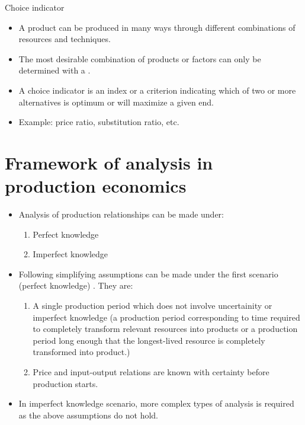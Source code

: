 \documentclass[12pt,ignorenonframetext,aspectratio=169]{beamer}
\providecommand{\tightlist}{%
  \setlength{\itemsep}{0pt}\setlength{\parskip}{0pt}}
\begin{document}
\begin{frame}{}
\protect\hypertarget{section-8}{}
\begin{block}{Choice indicator}
\protect\hypertarget{choice-indicator}{}
\begin{itemize}
\tightlist
\item
  A product can be produced in many ways through different combinations
  of resources and techniques.
\item
  The most desirable combination of products or factors can only be
  determined with a .
\item
  A choice indicator is an index or a criterion indicating which of two
  or more alternatives is optimum or will maximize a given end.
\item
  Example: price ratio, substitution ratio, etc.
\end{itemize}
\end{block}
\end{frame}

\hypertarget{framework-of-analysis-in-production-economics}{%
\section{Framework of analysis in production
economics}\label{framework-of-analysis-in-production-economics}}

\begin{frame}{}
\protect\hypertarget{section-9}{}
\begin{itemize}
\tightlist
\item
  Analysis of production relationships can be made under:

  \begin{enumerate}
  \tightlist
  \item
    Perfect knowledge
  \item
    Imperfect knowledge
  \end{enumerate}
\item
  Following simplifying assumptions can be made under the first scenario
  (perfect knowledge) . They are:

  \begin{enumerate}
  \tightlist
  \item
    A single production period which does not involve uncertainity or
    imperfect knowledge (a production period corresponding to time
    required to completely transform relevant resources into products or
    a production period long enough that the longest-lived resource is
    completely transformed into product.)
  \item
    Price and input-output relations are known with certainty before
    production starts.
  \end{enumerate}
\item
  In imperfect knowledge scenario, more complex types of analysis is
  required as the above assumptions do not hold.
\end{itemize}
\end{frame}
\end{document}
